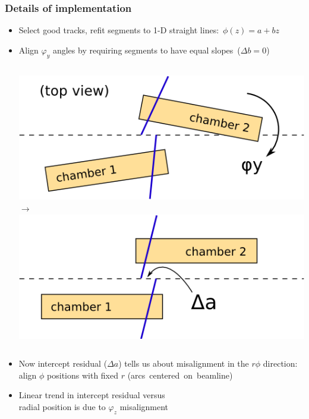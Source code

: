\documentclass[compress]{beamer}
\begin{document}
\begin{frame}
\frametitle{Details of implementation}

\begin{itemize}
\item Select good tracks, refit segments to 1-D straight \mbox{lines: $\phi(z) = a + b z$\hspace{-1 cm}}
\item Align $\varphi_y$ angles by requiring segments to have equal \mbox{slopes ($\Delta b = 0$)\hspace{-1 cm}}

\begin{center}
\begin{columns}
\includegraphics[width=\linewidth]{topview_1.png}
\hfill $\to$ \hfill
{}
\includegraphics[width=\linewidth]{topview_2.png}
\end{columns}
\end{center}

\item Now intercept residual ($\Delta a$) tells us about misalignment in the $r\phi$ direction: align $\phi$ positions with fixed $r$ \mbox{(arcs centered on beamline)\hspace{-1 cm}}

\item Linear trend in intercept residual versus \\ radial position is due to $\varphi_z$ misalignment
\end{itemize}


\end{frame}
\end{document}
